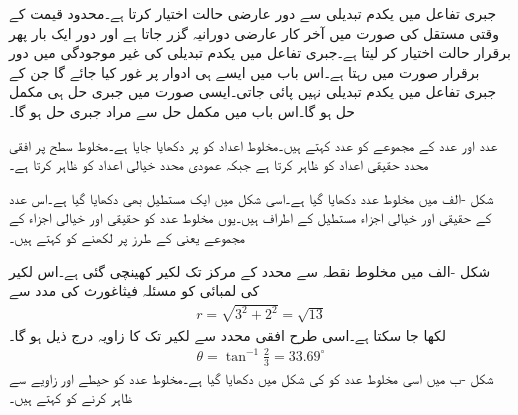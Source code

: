 جبری تفاعل میں یکدم تبدیلی سے دور عارضی حالت اختیار کرتا ہے۔محدود قیمت کے وقتی مستقل کی صورت میں آخر کار عارضی دورانیہ گزر جاتا ہے اور دور ایک بار پھر برقرار حالت اختیار کر لیتا ہے۔جبری تفاعل میں یکدم تبدیلی کی غیر موجودگی میں دور برقرار صورت میں رہتا ہے۔اس باب میں ایسے ہی ادوار پر غور کیا جائے گا جن کے جبری تفاعل میں یکدم تبدیلی نہیں پائی جاتی۔ایسی صورت میں جبری حل ہی مکمل حل ہو گا۔اس باب میں مکمل حل  سے مراد جبری حل ہو گا۔ 
 
 عدد اور  عدد کے مجموعے کو  عدد کہتے ہیں۔مخلوط اعداد کو  پر دکھایا جایا ہے۔مخلوط سطح پر افقی محدد حقیقی اعداد کو ظاہر کرتا ہے جبکہ عمودی محدد خیالی اعداد کو ظاہر کرتا ہے۔

شکل -الف میں مخلوط عدد  دکھایا گیا ہے۔اسی شکل میں ایک مستطیل بھی دکھایا گیا ہے۔اس عدد کے حقیقی اور خیالی اجزاء مستطیل کے اطراف ہیں۔یوں مخلوط عدد کو حقیقی اور خیالی اجزاء کے مجموعے یعنی  کے طرز پر لکھنے کو  کہتے ہیں۔ 

شکل -الف میں مخلوط نقطہ  سے محدد کے مرکز  تک لکیر کھینچی گئی ہے۔اس لکیر کی لمبائی  کو مسئلہ فیثاغورث کی مدد سے
\begin{align*}
r=\sqrt{3^2+2^2}=\sqrt{13}
\end{align*}
لکھا جا سکتا ہے۔اسی طرح افقی محدد سے لکیر تک کا زاویہ درج ذیل ہو گا۔
\begin{align*}
\theta=\tan^{-1}\frac{2}{3}=33.69^{\circ}
\end{align*}
شکل -ب میں اسی مخلوط عدد کو  کی شکل میں دکھایا گیا ہے۔مخلوط عدد کو حیطے اور زاویے سے ظاہر کرنے کو  کہتے ہیں۔

